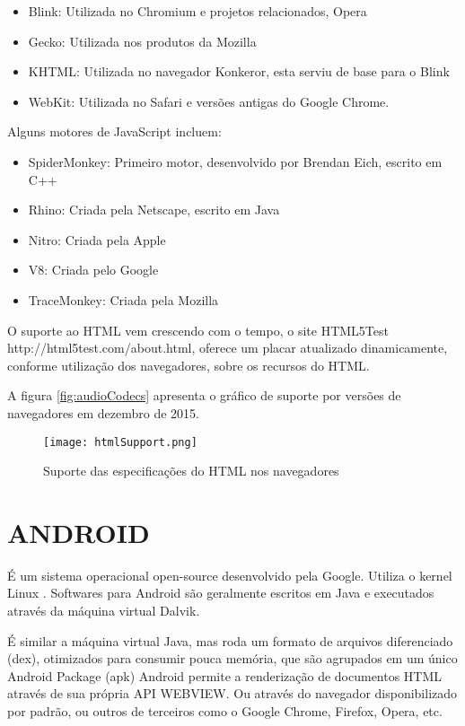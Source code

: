 \begin{itemize}
    \item Blink: Utilizada no Chromium e projetos relacionados, Opera
    \item Gecko: Utilizada nos produtos da Mozilla
    \item KHTML: Utilizada no navegador Konkeror, esta serviu de base para o Blink
    \item WebKit: Utilizada no Safari e versões antigas do Google Chrome.
\end{itemize}

Alguns motores de JavaScript incluem:

\begin{itemize}
    \item SpiderMonkey: Primeiro motor, desenvolvido por Brendan Eich, escrito em C++
    \item Rhino: Criada pela Netscape, escrito em Java
    \item Nitro: Criada pela Apple
    \item V8: Criada pelo Google
    \item TraceMonkey: Criada pela Mozilla
\end{itemize}

O suporte ao HTML vem crescendo com o tempo, o site HTML5Test
http://html5test.com/about.html, oferece um placar atualizado
dinamicamente, conforme utilização dos navegadores, sobre os recursos
do HTML.

A figura \ref{fig:audioCodecs} apresenta o gráfico de suporte por versões de navegadores em dezembro de 2015.

\begin{figure}
    \centering
    \texttt{[image: htmlSupport.png]}
	\caption{Suporte das especificações do HTML nos navegadores}
    \label{fig:htmlSupport}
\end{figure}

\section{ANDROID}

É um sistema operacional open-source desenvolvido pela Google.
Utiliza o kernel Linux .
Softwares para Android são geralmente escritos em Java e executados
através da máquina virtual Dalvik.

É similar a máquina virtual Java, mas roda um
formato de arquivos diferenciado (dex), otimizados para consumir pouca
memória, que são agrupados em um único Android Package (apk) Android
permite a renderização de documentos HTML através de sua própria
API WEBVIEW. Ou através do navegador disponibilizado por padrão, ou
outros de terceiros como o Google Chrome, Firefox, Opera, etc.

